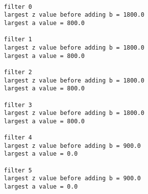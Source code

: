 \documentclass[11pt]{article}
\begin{document}
    \begin{Verbatim}[commandchars=\\\{\}]

filter 0
largest z value before adding b = 1800.0
largest a value = 800.0

filter 1
largest z value before adding b = 1800.0
largest a value = 800.0

filter 2
largest z value before adding b = 1800.0
largest a value = 800.0

filter 3
largest z value before adding b = 1800.0
largest a value = 800.0

filter 4
largest z value before adding b = 900.0
largest a value = 0.0

filter 5
largest z value before adding b = 900.0
largest a value = 0.0
    \end{Verbatim}

    \begin{center}
    \end{center}
    { \hspace*{\fill} \\}
    
\end{document}
